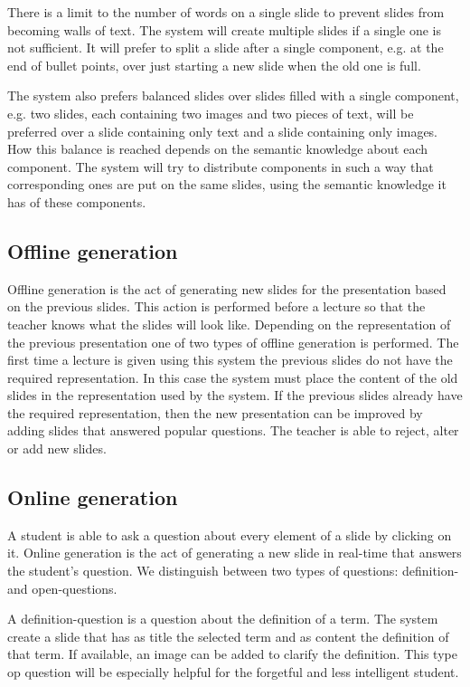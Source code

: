 \documentclass[11pt]{article}
\begin{document}
There is a limit to the number of words on a single slide to prevent slides from becoming walls of text. The system will create multiple slides if a single one is not sufficient. It will prefer to split a slide after a single component, e.g. at the end of bullet points, over just starting a new slide when the old one is full. 

The system also prefers balanced slides over slides filled with a single component, e.g. two slides, each containing two images and two pieces of text, will be preferred over a slide containing only text and a slide containing only images. How this balance is reached depends on the semantic knowledge about each component. The system will try to distribute components in such a way that corresponding ones are put on the same slides, using the semantic knowledge it has of these components. 

\subsection{Offline generation}
Offline generation is the act of generating new slides for the presentation based on the previous slides. This action is performed before a lecture so that the teacher knows what the slides will look like. Depending on the representation of the previous presentation one of two types of offline generation is performed. The first time a lecture is given using this system the previous slides do not have the required representation. In this case the system must place the content of the old slides in the representation used by the system. If the previous slides already have the required representation, then the new presentation can be improved by adding slides that answered popular questions. The teacher is able to reject, alter or add new slides.

\subsection{Online generation}
A student is able to ask a question about every element of a slide by clicking on it. Online generation is the act of generating a new slide in real-time that answers the student's question. We distinguish between two types of questions: definition- and open-questions. 

A definition-question is a question about the definition of a term. The system create a slide that has as title the selected term and as content the definition of that term. If available, an image can be added to clarify the definition. This type op question will be especially helpful for the forgetful and less intelligent student. 
\end{document}
